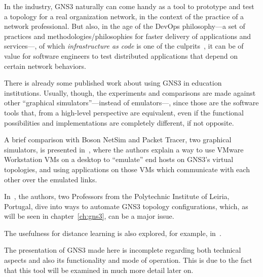 In the industry, GNS3 naturally can come handy as a tool to prototype and test a topology for a real organization network, in the context of the practice of a network professional.
But also, in the age of the DevOps philosophy---a set of practices and methodologies/philosophies for faster delivery of applications and services---, of which \emph{infrastructure as code} is one of the culprits~\cite{awswhatisdevops}, it can be of value for software engineers to test distributed applications that depend on certain network behaviors.


There is already some published work about using GNS3 in education institutions.
Usually, though, the experiments and comparisons are made against other ``graphical simulators''---instead of emulators---, since those are the software tools that, from a high-level perspective are equivalent, even if the functional possibilities and implementations are completely different, if not opposite.

A brief comparison with Boson NetSim and Packet Tracer, two graphical simulators, is presented in~\cite{virtlabgnsvmware}, where the authors explain a way to use VMware Workstation VMs on a desktop to ``emulate'' end hosts on GNS3's virtual topologies, and using applications on those VMs which communicate with each other over the emulated links.

In~\cite{automaticnetconfiggns}, the authors, two Professors from the Polytechnic Institute of Leiria, Portugal, dive into ways to automate GNS3 topology configurations, which, as will be seen in chapter~\ref{ch:gns3}, can be a major issue. %

The usefulness for distance learning is also explored, for example, in~\cite{networkvirtwithgns}.

The presentation of GNS3 made here is incomplete regarding both technical aspects and also its functionality and mode of operation.
This is due to the fact that this tool will be examined in much more detail later on.

